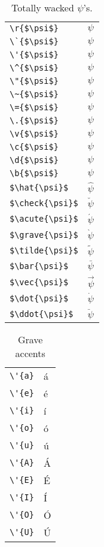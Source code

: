 \documentclass{article}
\begin{document}
\begin{table}
\pagebreak
\begin{center}
\begin{tabular}{ll}
\verb#\r{$\psi$}#& \r{$\psi$}\\
\verb#\`{$\psi$}#& \`{$\psi$}\\
\verb#\'{$\psi$}#& \'{$\psi$}\\
\verb#\^{$\psi$}#& \^{$\psi$}\\
\verb#\"{$\psi$}#& \"{$\psi$}\\
\verb#\~{$\psi$}#& \~{$\psi$}\\
\verb#\={$\psi$}#& \={$\psi$}\\
\verb#\.{$\psi$}#& \.{$\psi$}\\
\verb#\v{$\psi$}#& \v{$\psi$}\\
\verb#\c{$\psi$}#& \c{$\psi$}\\
\verb#\d{$\psi$}#& \d{$\psi$}\\
\verb#\b{$\psi$}#& \b{$\psi$}\\
\verb#$\hat{\psi}$#& $\hat{\psi}$\\
\verb#$\check{\psi}$#& $\check{\psi}$\\
\verb#$\acute{\psi}$#& $\acute{\psi}$\\
\verb#$\grave{\psi}$#& $\grave{\psi}$\\
\verb#$\tilde{\psi}$#& $\tilde{\psi}$\\
\verb#$\bar{\psi}$#& $\bar{\psi}$\\
\verb#$\vec{\psi}$#& $\vec{\psi}$\\
\verb#$\dot{\psi}$#& $\dot{\psi}$\\
\verb#$\ddot{\psi}$#& $\ddot{\psi}$
\end{tabular}
\caption{Totally wacked $\psi$'s.}
\end{center}
\end{table}
\pagebreak

\begin{table}
\begin{center}
\begin{tabular}{ll}
\verb#\'{a}#& \'{a}\\
\verb#\'{e}#& \'{e}\\
\verb#\'{i}#& \'{i}\\
\verb#\'{o}#& \'{o}\\
\verb#\'{u}#& \'{u}\\
\verb#\'{A}#& \'{A}\\
\verb#\'{E}#& \'{E}\\
\verb#\'{I}#& \'{I}\\
\verb#\'{O}#& \'{O}\\
\verb#\'{U}#& \'{U}
\end{tabular}
\caption{Grave accents}
\end{center}
\end{table}
\end{document}
